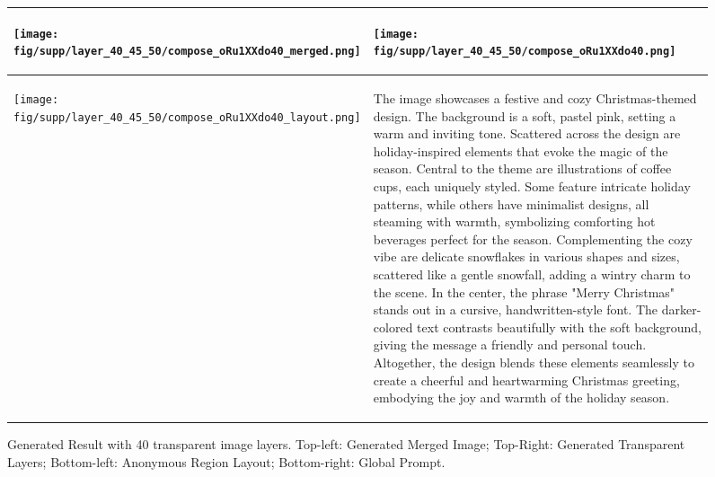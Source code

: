 \begin{figure*}[h]
\begin{tabular}{|p{}|p{}|}
\hline
\begin{center}
\texttt{[image: fig/supp/layer\_40\_45\_50/compose\_oRu1XXdo40\_merged.png]}
\end{center}
& 
\begin{flushleft}

\texttt{[image: fig/supp/layer\_40\_45\_50/compose\_oRu1XXdo40.png]}
\end{flushleft} \\
\hline
\begin{center}
\texttt{[image: fig/supp/layer\_40\_45\_50/compose\_oRu1XXdo40\_layout.png]}
\end{center}
& 
\begin{flushleft}
{\small The image showcases a festive and cozy Christmas-themed design. The background is a soft, pastel pink, setting a warm and inviting tone. Scattered across the design are holiday-inspired elements that evoke the magic of the season. Central to the theme are illustrations of coffee cups, each uniquely styled. Some feature intricate holiday patterns, while others have minimalist designs, all steaming with warmth, symbolizing comforting hot beverages perfect for the season. Complementing the cozy vibe are delicate snowflakes in various shapes and sizes, scattered like a gentle snowfall, adding a wintry charm to the scene. In the center, the phrase "Merry Christmas" stands out in a cursive, handwritten-style font. The darker-colored text contrasts beautifully with the soft background, giving the message a friendly and personal touch. Altogether, the design blends these elements seamlessly to create a cheerful and heartwarming Christmas greeting, embodying the joy and warmth of the holiday season.}
\end{flushleft} \\
\hline
\end{tabular}
\caption{Generated Result with 40 transparent image layers. Top-left: Generated Merged Image; Top-Right: Generated Transparent Layers; Bottom-left: Anonymous Region Layout; Bottom-right: Global Prompt.}
\label{fig:more_layer_40}
\end{figure*}





